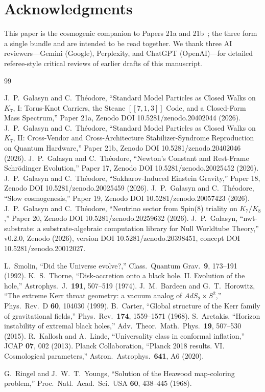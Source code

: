\documentclass[11pt]{article}
\newcommand{\Klogical}{[[7, 1, 3]]}
\begin{document}
\section*{Acknowledgments}

This paper is the cosmogenic companion to Papers 21a and 21b~\cite{Paper21a,Paper21b}; the three form a single bundle and are intended to be read together.  We thank three AI reviewers---Gemini (Google), Perplexity, and ChatGPT (OpenAI)---for detailed referee-style critical reviews of earlier drafts of this manuscript.

\begin{thebibliography}{99}

 J.~P.~Galasyn and C.~Th\'eodore, ``Standard Model Particles as Closed Walks on $K_7$, I: Torus-Knot Carriers, the Steane $\Klogical$ Code, and a Closed-Form Mass Spectrum,'' Paper 21a, Zenodo DOI 10.5281/zenodo.20402044 (2026).
 J.~P.~Galasyn and C.~Th\'eodore, ``Standard Model Particles as Closed Walks on $K_7$, II: Cross-Vendor and Cross-Architecture Stabilizer-Syndrome Reproduction on Quantum Hardware,'' Paper 21b, Zenodo DOI 10.5281/zenodo.20402046 (2026).
 J.~P.~Galasyn and C.~Th\'eodore, ``Newton's Constant and Rest-Frame Schr\"odinger Evolution,'' Paper 17, Zenodo DOI 10.5281/zenodo.20025452 (2026).
 J.~P.~Galasyn and C.~Th\'eodore, ``Sakharov-Induced Einstein Gravity,'' Paper 18, Zenodo DOI 10.5281/zenodo.20025459 (2026).
 J.~P.~Galasyn and C.~Th\'eodore, ``Slow cosmogenesis,'' Paper 19, Zenodo DOI 10.5281/zenodo.20057423 (2026).
 J.~P.~Galasyn and C.~Th\'eodore, ``Neutrino sector from Spin(8) triality on $K_7/K_8$,'' Paper 20, Zenodo DOI 10.5281/zenodo.20259632 (2026).
 J.~P.~Galasyn, ``nwt-substrate: a substrate-algebraic computation library for Null Worldtube Theory,'' v0.2.0, Zenodo (2026), version DOI 10.5281/zenodo.20398451, concept DOI 10.5281/zenodo.20012027.

 L.~Smolin, ``Did the Universe evolve?,'' Class.\ Quantum Grav.\ \textbf{9}, 173--191 (1992).
 K.~S.~Thorne, ``Disk-accretion onto a black hole. II. Evolution of the hole,'' Astrophys.\ J.\ \textbf{191}, 507--519 (1974).
 J.~M.~Bardeen and G.~T.~Horowitz, ``The extreme Kerr throat geometry: a vacuum analog of $AdS_2 \times S^2$,'' Phys.\ Rev.\ D \textbf{60}, 104030 (1999).
 B.~Carter, ``Global structure of the Kerr family of gravitational fields,'' Phys.\ Rev.\ \textbf{174}, 1559--1571 (1968).
 S.~Aretakis, ``Horizon instability of extremal black holes,'' Adv.\ Theor.\ Math.\ Phys.\ \textbf{19}, 507--530 (2015).
 R.~Kallosh and A.~Linde, ``Universality class in conformal inflation,'' JCAP \textbf{07}, 002 (2013).
 Planck Collaboration, ``Planck 2018 results. VI. Cosmological parameters,'' Astron.\ Astrophys.\ \textbf{641}, A6 (2020).

 G.~Ringel and J.~W.~T.~Youngs, ``Solution of the Heawood map-coloring problem,'' Proc.\ Natl.\ Acad.\ Sci.\ USA \textbf{60}, 438--445 (1968).

\end{thebibliography}
\end{document}
